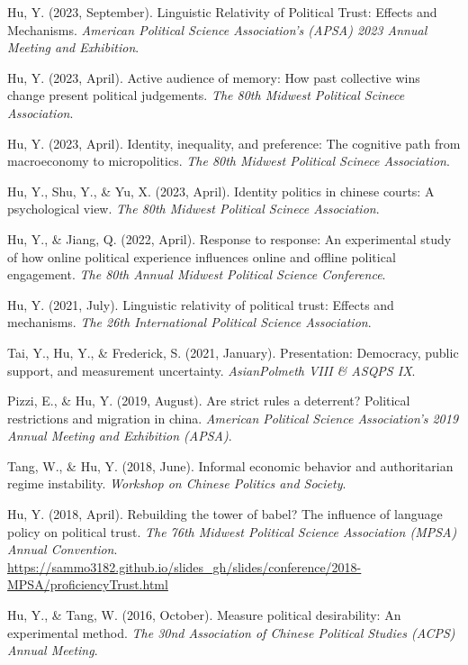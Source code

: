 \documentclass[
  12pt,
]
{article}
\newlength{\cslhangindent}
\newlength{\cslentryspacingunit} %
\newenvironment{CSLReferences}[2] %
 {%
  \setlength{\parindent}{0pt}
  \ifodd #1
  \let\oldpar\par
  \def\par{\hangindent=\cslhangindent\oldpar}
  \fi
  \setlength{\parskip}{#2\cslentryspacingunit}
 }%
 {}
\begin{document}
\hypertarget{refs-conference}{}
\begin{CSLReferences}{1}{0}
\leavevmode{}%
Hu, Y. (2023, September). Linguistic {Relativity} of {Political Trust}:
{Effects} and {Mechanisms}. \emph{American {Political Science
Association}'s ({APSA}) 2023 {Annual Meeting} and {Exhibition}}.

\leavevmode{}%
Hu, Y. (2023, April). Active audience of memory: How past collective
wins change present political judgements. \emph{The 80th {Midwest
Political Scinece Association}}.

\leavevmode{}%
Hu, Y. (2023, April). Identity, inequality, and preference: The
cognitive path from macroeconomy to micropolitics. \emph{The 80th
{Midwest Political Scinece Association}}.

\leavevmode{}%
Hu, Y., Shu, Y., \& Yu, X. (2023, April). Identity politics in chinese
courts: A psychological view. \emph{The 80th {Midwest Political Scinece
Association}}.

\leavevmode{}%
Hu, Y., \& Jiang, Q. (2022, April). Response to response: An
experimental study of how online political experience influences online
and offline political engagement. \emph{The 80th {Annual Midwest
Political Science Conference}}.

\leavevmode{}%
Hu, Y. (2021, July). Linguistic relativity of political trust: Effects
and mechanisms. \emph{The 26th {International Political Science
Association}}.

\leavevmode{}%
Tai, Y., Hu, Y., \& Frederick, S. (2021, January). Presentation:
{Democracy}, public support, and measurement uncertainty.
\emph{{AsianPolmeth VIII} \& {ASQPS IX}}.

\leavevmode{}%
Pizzi, E., \& Hu, Y. (2019, August). Are strict rules a deterrent?
{Political} restrictions and migration in china. \emph{American
{Political Science Association}'s 2019 {Annual Meeting} and {Exhibition}
({APSA})}.

\leavevmode{}%
Tang, W., \& Hu, Y. (2018, June). Informal economic behavior and
authoritarian regime instability. \emph{Workshop on {Chinese Politics}
and {Society}}.

\leavevmode{}%
Hu, Y. (2018, April). Rebuilding the tower of babel? {The} influence of
language policy on political trust. \emph{The 76th {Midwest Political
Science Association} ({MPSA}) {Annual Convention}}.
\url{https://sammo3182.github.io/slides_gh/slides/conference/2018-MPSA/proficiencyTrust.html}

\leavevmode{}%
Hu, Y., \& Tang, W. (2016, October). Measure political desirability: An
experimental method. \emph{The 30nd {Association} of {Chinese Political
Studies} ({ACPS}) {Annual Meeting}}.

\end{CSLReferences}
\end{document}
